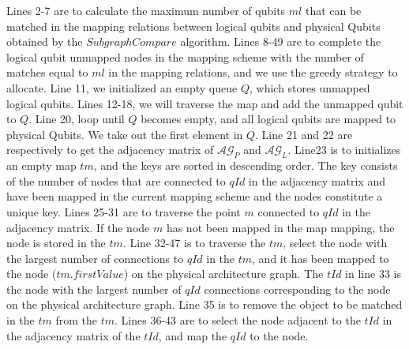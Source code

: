\documentclass[runningheads]{llncs}
\begin{document}
Lines 2-7 are to calculate the maximum number of qubits $ml$ that can be matched in the mapping relations 
between logical qubits and physical Qubits obtained by the $SubgraphCompare$ algorithm.
Lines 8-49 are to complete the logical qubit unmapped nodes in the mapping scheme with the number 
of matches equal to $ml$ in the mapping relations, and we use the greedy strategy to allocate.
Line 11, we initialized an empty queue $Q$, which stores unmapped logical qubits.
Lines 12-18, we will traverse the map and add the unmapped qubit to $Q$.
Line 20, loop until $Q$ becomes empty, and all logical qubits are mapped to physical Qubits.
We take out the first element in $Q$. 
Line 21 and 22 are respectively to get the adjacency matrix of $\mathcal{AG}_{P}$ and $\mathcal{AG}_{L}$. 
Line23 is to initializes an empty map $tm$, and the keys are sorted in descending order. 
The key consists of the number of nodes that are connected to $qId$ in the adjacency 
matrix and have been mapped in the current mapping scheme and the nodes constitute a unique key.
Lines 25-31 are to traverse the point $m$ connected to $qId$ in the adjacency matrix. 
If the node $m$ has not been mapped in the map mapping, the node is stored in the $tm$.
Line 32-47 is to traverse the $tm$, select the node with the largest number of 
connections to $qId$ in the $tm$, and it has been mapped to the node ($tm.firstValue$) 
on the physical architecture graph.
The $tId$ in line 33 is the node with the largest number of $qId$ connections 
corresponding to the node on the physical architecture graph.
Line 35 is to remove the object to be matched in the $tm$ from the $tm$.
Lines 36-43 are to select the node adjacent to the $tId$ in the adjacency matrix of the $tId$, 
and map the $qId$ to the node.
\end{document}
